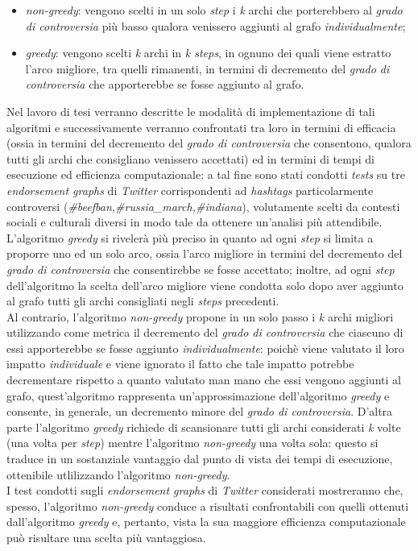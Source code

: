 \documentclass[trieste,12pt]{toptesi}
\begin{document}
\begin{itemize}
\item \textit{non-greedy}: vengono scelti in un solo \textit{step} i \textit{k} archi che porterebbero al \textit{grado di controversia} più basso qualora venissero aggiunti al grafo \textit{individualmente};
\item \textit{greedy}: vengono scelti \textit{k} archi in \textit{k steps}, in ognuno dei quali viene estratto l'arco migliore, tra quelli rimanenti, in termini di decremento del \textit{grado di controversia} che apporterebbe se fosse aggiunto al grafo.
\end{itemize}
Nel lavoro di tesi verranno descritte le modalità di implementazione di tali algoritmi e successivamente verranno confrontati tra loro in termini di efficacia (ossia in termini del decremento del \textit{grado di controversia} che consentono, qualora tutti gli archi che consigliano venissero accettati) ed in termini di tempi di esecuzione ed efficienza computazionale: a tal fine sono stati condotti \textit{tests} su tre \textit{endorsement graphs} di \textit{Twitter} corrispondenti ad \textit{hashtags} particolarmente controversi (\textit{\#beefban,\#russia\_march,\#indiana}), volutamente scelti da contesti sociali e culturali diversi in modo tale da ottenere un'analisi più attendibile.\\L'algoritmo \textit{greedy} si rivelerà più preciso in quanto ad ogni \textit{step} si limita a proporre uno ed un solo arco, ossia l'arco migliore in termini del decremento del \textit{grado di controversia} che consentirebbe se fosse accettato; inoltre, ad ogni \textit{step} dell'algoritmo la scelta dell'arco migliore viene condotta solo dopo aver aggiunto al grafo tutti gli archi consigliati negli \textit{steps} precedenti.\\Al contrario, l'algoritmo \textit{non-greedy} propone in un solo passo i \textit{k} archi migliori utilizzando come metrica il decremento del \textit{grado di controversia} che ciascuno di essi apporterebbe se fosse aggiunto \textit{individualmente}: poichè viene valutato il loro impatto \textit{individuale} e viene ignorato il fatto che tale impatto potrebbe decrementare rispetto a quanto valutato man mano che essi vengono aggiunti al grafo, quest'algoritmo rappresenta un'approssimazione dell'algoritmo \textit{greedy} e consente, in generale, un decremento minore del \textit{grado di controversia}. D'altra parte l'algoritmo \textit{greedy} richiede di scansionare tutti gli archi considerati \textit{k} volte (una volta per \textit{step})  mentre l'algoritmo \textit{non-greedy} una volta sola: questo si traduce in un sostanziale vantaggio dal punto di vista dei tempi di esecuzione, ottenibile utlilizzando l'algoritmo \textit{non-greedy}.\\I test condotti sugli \textit{endorsement graphs} di \textit{Twitter} considerati mostreranno che, spesso, l'algoritmo \textit{non-greedy} conduce a risultati confrontabili con quelli ottenuti dall'algoritmo \textit{greedy} e, pertanto, vista la sua maggiore efficienza computazionale può risultare una scelta più vantaggiosa.
\end{document}
